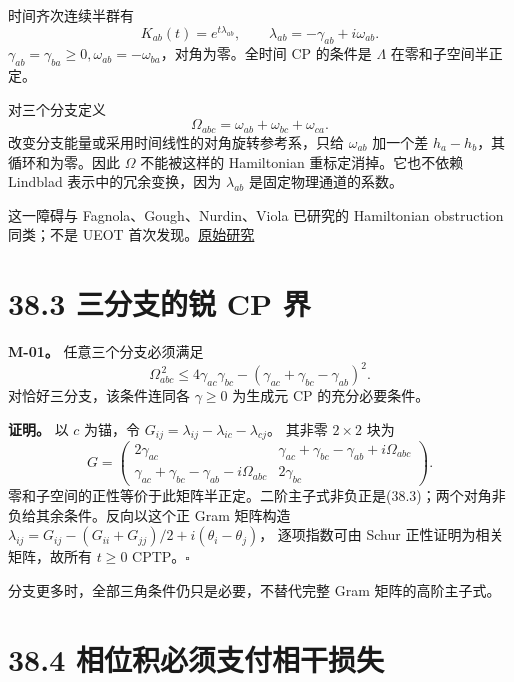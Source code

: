 \documentclass[
  11pt,
  oneside]{book}
\begin{document}
时间齐次连续半群有 \[
K_{ab}(t)=e^{t\lambda_{ab}},\qquad
\lambda_{ab}=-\gamma_{ab}+i\omega_{ab}.
\]
\(\gamma_{ab}=\gamma_{ba}\ge0,\omega_{ab}=-\omega_{ba}\)，对角为零。全时间
CP 的条件是 \(\Lambda\) 在零和子空间半正定。

对三个分支定义 \[
\Omega_{abc}=\omega_{ab}+\omega_{bc}+\omega_{ca}.
\tag{38.2}
\] 改变分支能量或采用时间线性的对角旋转参考系，只给 \(\omega_{ab}\)
加一个差 \(h_a-h_b\)，其循环和为零。因此 \(\Omega\) 不能被这样的
Hamiltonian 重标定消掉。它也不依赖 Lindblad 表示中的冗余变换，因为
\(\lambda_{ab}\) 是固定物理通道的系数。

这一障碍与 Fagnola、Gough、Nurdin、Viola 已研究的 Hamiltonian
obstruction 同类；不是 UEOT
首次发现。\href{https://arxiv.org/abs/1811.11784}{原始研究}

\hypertarget{ux4e09ux5206ux652fux7684ux9510-cp-ux754c}{%
\section{38.3 三分支的锐 CP
界}\label{ux4e09ux5206ux652fux7684ux9510-cp-ux754c}}

\protect\hypertarget{m-01}{}{}

\textbf{M-01。} 任意三个分支必须满足 \[
\boxed{\ 
\Omega_{abc}^{\,2}
\le
4\gamma_{ac}\gamma_{bc}
-(\gamma_{ac}+\gamma_{bc}-\gamma_{ab})^2.\ }
\tag{38.3}
\] 对恰好三分支，该条件连同各 \(\gamma\ge0\) 为生成元 CP
的充分必要条件。

\textbf{证明。} 以 \(c\) 为锚，令
\(G_{ij}=\lambda_{ij}-\lambda_{ic}-\lambda_{cj}\)。 其非零 \(2\times2\)
块为 \[
G=
\begin{pmatrix}
2\gamma_{ac}&
\gamma_{ac}+\gamma_{bc}-\gamma_{ab}+i\Omega_{abc}\\
\gamma_{ac}+\gamma_{bc}-\gamma_{ab}-i\Omega_{abc}&
2\gamma_{bc}
\end{pmatrix}.
\]
零和子空间的正性等价于此矩阵半正定。二阶主子式非负正是(38.3)；两个对角非负给其余条件。反向以这个正
Gram 矩阵构造
\(\lambda_{ij}=G_{ij}-(G_{ii}+G_{jj})/2+i(\theta_i-\theta_j)\)，
逐项指数可由 Schur 正性证明为相关矩阵，故所有 \(t\ge0\)
CPTP。\(\square\)

分支更多时，全部三角条件仍只是必要，不替代完整 Gram 矩阵的高阶主子式。

\hypertarget{ux76f8ux4f4dux79efux5fc5ux987bux652fux4ed8ux76f8ux5e72ux635fux5931}{%
\section{38.4
相位积必须支付相干损失}\label{ux76f8ux4f4dux79efux5fc5ux987bux652fux4ed8ux76f8ux5e72ux635fux5931}}
\end{document}
